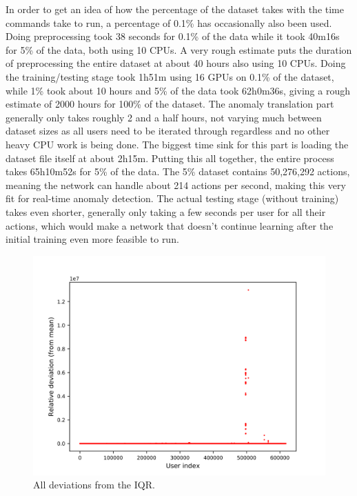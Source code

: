 In order to get an idea of how the percentage of the dataset takes with the time commands take to run, a percentage of 0.1\% has occasionally also been used. Doing preprocessing took 38 seconds for 0.1\% of the data while it took 40m16s for 5\% of the data, both using 10 CPUs. A very rough estimate puts the duration of preprocessing the entire dataset at about 40 hours also using 10 CPUs. Doing the training/testing stage took 1h51m using 16 GPUs on 0.1\% of the dataset, while 1\% took about 10 hours and 5\% of the data took 62h0m36s, giving a rough estimate of 2000 hours for 100\% of the dataset. The anomaly translation part generally only takes roughly 2 and a half hours, not varying much between dataset sizes as all users need to be iterated through regardless and no other heavy CPU work is being done. The biggest time sink for this part is loading the dataset file itself at about 2h15m. Putting this all together, the entire process takes 65h10m52s for 5\% of the data. The 5\% dataset contains 50,276,292 actions, meaning the network can handle about 214 actions per second, making this very fit for real-time anomaly detection. The actual testing stage (without training) takes even shorter, generally only taking a few seconds per user for all their actions, which would make a network that doesn't continue learning after the initial training even more feasible to run.

\begin{figure}
	\begin{center}
		\includegraphics[scale=0.1]{evaluation/all_deviations}
	\end{center}
	\caption{All deviations from the IQR.~\label{fig:iqr_scale}}
\end{figure}

